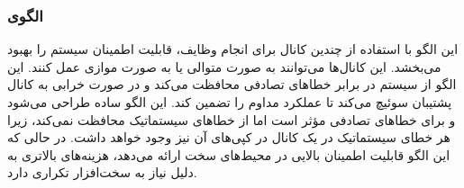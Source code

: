 \subsubsection{الگوی }
\label{archSafeHomoRedundancySec}
\begin{RTL}
این الگو \cite{ref4} با استفاده از چندین کانال برای انجام وظایف، قابلیت اطمینان
سیستم را بهبود می‌بخشد. این کانال‌ها می‌توانند به صورت متوالی یا به صورت موازی
عمل کنند. این الگو از سیستم در برابر خطاهای تصادفی محافظت می‌کند و
در صورت خرابی به کانال پشتیبان سوئیچ می‌کند تا عملکرد مداوم را
تضمین کند. این الگو ساده طراحی می‌شود و برای خطاهای تصادفی مؤثر است
اما از خطاهای سیستماتیک محافظت نمی‌کند، زیرا هر خطای سیستماتیک در یک
کانال در کپی‌های آن نیز وجود خواهد داشت. در حالی که این الگو قابلیت
اطمینان بالایی در محیط‌های سخت ارائه می‌دهد، هزینه‌های بالاتری
به دلیل نیاز به سخت‌افزار تکراری دارد.
\end{RTL}